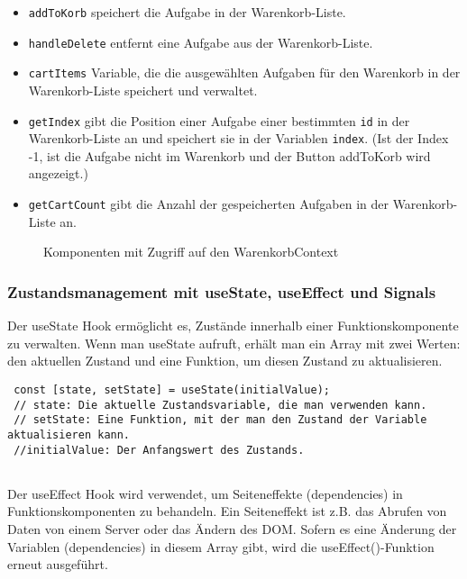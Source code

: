  \begin{itemize}

  \item \texttt{addToKorb} speichert die Aufgabe in der Warenkorb-Liste.
  \item \texttt{handleDelete} entfernt eine Aufgabe aus der Warenkorb-Liste.
  \item  \texttt{cartItems} Variable, die die ausgewählten Aufgaben für den Warenkorb in der Warenkorb-Liste speichert und verwaltet.
  \item \texttt{getIndex} gibt die Position einer Aufgabe einer bestimmten \texttt{id} in der Warenkorb-Liste an und speichert sie in der Variablen \texttt{index}. (Ist der Index -1, ist die Aufgabe nicht im Warenkorb und der Button addToKorb wird angezeigt.)
  \item \texttt{getCartCount} gibt die Anzahl der gespeicherten Aufgaben in der Warenkorb-Liste an.
 \end{itemize}

 \begin{figure}[ht]
 \caption{Komponenten mit Zugriff auf den WarenkorbContext \cite{fig:all2}}
 \end{figure}


 \subsubsection{Zustandsmanagement mit useState, useEffect und Signals}

 Der useState Hook ermöglicht es, Zustände innerhalb einer Funktionskomponente zu verwalten. Wenn man useState aufruft, erhält man ein Array mit zwei Werten: den aktuellen Zustand und eine Funktion, um diesen Zustand zu aktualisieren.
 
 \begin{lstlisting}
 const [state, setState] = useState(initialValue);
 // state: Die aktuelle Zustandsvariable, die man verwenden kann.
 // setState: Eine Funktion, mit der man den Zustand der Variable aktualisieren kann.
 //initialValue: Der Anfangswert des Zustands.
 
 \end{lstlisting}
 
 
 Der useEffect Hook wird verwendet, um Seiteneffekte (dependencies) in Funktionskomponenten zu behandeln. Ein Seiteneffekt ist z.B. das Abrufen von Daten von einem Server oder das Ändern des DOM. Sofern es eine Änderung der Variablen (dependencies) in diesem Array gibt, wird die useEffect()-Funktion erneut ausgeführt.
 
